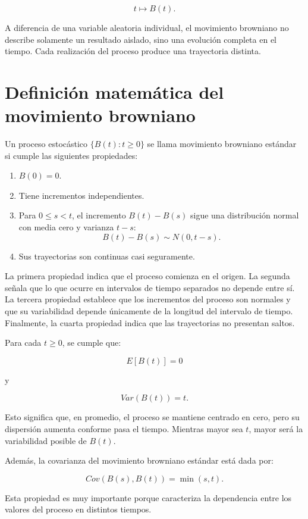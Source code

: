\documentclass[12pt]{article}
\begin{document}
\[
t \mapsto B(t).
\]

A diferencia de una variable aleatoria individual, el movimiento browniano no describe solamente un resultado aislado, sino una evolución completa en el tiempo. Cada realización del proceso produce una trayectoria distinta.

\section{Definición matemática del movimiento browniano}

Un proceso estocástico $\{B(t):t\geq 0\}$ se llama movimiento browniano estándar si cumple las siguientes propiedades:

\begin{enumerate}
    \item $B(0)=0$.
    \item Tiene incrementos independientes.
    \item Para $0\leq s<t$, el incremento $B(t)-B(s)$ sigue una distribución normal con media cero y varianza $t-s$:
    \[
    B(t)-B(s)\sim N(0,t-s).
    \]
    \item Sus trayectorias son continuas casi seguramente.
\end{enumerate}

La primera propiedad indica que el proceso comienza en el origen. La segunda señala que lo que ocurre en intervalos de tiempo separados no depende entre sí. La tercera propiedad establece que los incrementos del proceso son normales y que su variabilidad depende únicamente de la longitud del intervalo de tiempo. Finalmente, la cuarta propiedad indica que las trayectorias no presentan saltos.

Para cada $t\geq 0$, se cumple que:

\[
E[B(t)] = 0
\]

y

\[
Var(B(t)) = t.
\]

Esto significa que, en promedio, el proceso se mantiene centrado en cero, pero su dispersión aumenta conforme pasa el tiempo. Mientras mayor sea $t$, mayor será la variabilidad posible de $B(t)$.

Además, la covarianza del movimiento browniano estándar está dada por:

\[
Cov(B(s),B(t))=\min(s,t).
\]

Esta propiedad es muy importante porque caracteriza la dependencia entre los valores del proceso en distintos tiempos.
\end{document}
